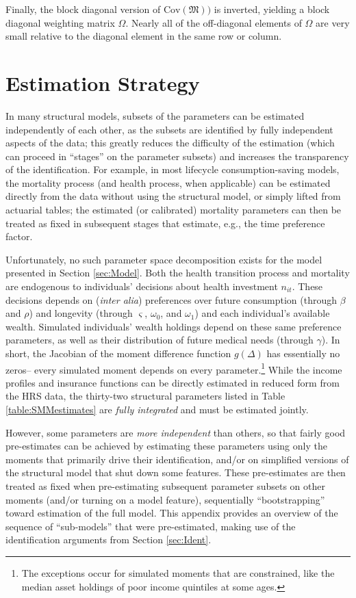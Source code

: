 \documentclass[12pt,pdftex,letterpaper]{article}
\newcommand{\Cov}{\text{Cov}}
\newcommand{\Invst}{n}
\newcommand{\MedShkParam}{\gamma}
\newcommand{\DiscFac}{\beta}
\newcommand{\LifeUtility}{\varsigma}
\newcommand{\CRRAcon}{\rho}
\newcommand{\BequestParam}{\omega}
\begin{document}
Finally, the block diagonal version of $\Cov(\mathfrak{M}))$ is inverted, yielding a block diagonal weighting matrix $\Omega$.  Nearly all of the off-diagonal elements of $\Omega$ are very small relative to the diagonal element in the same row or column.


\section{Estimation Strategy}
\label{app:Strategy}

In many structural models, subsets of the parameters can be estimated independently of each other, as the subsets are identified by fully independent aspects of the data; this greatly reduces the difficulty of the estimation (which can proceed in ``stages'' on the parameter subsets) and increases the transparency of the identification.  For example, in most lifecycle consumption-saving models, the mortality process (and health process, when applicable) can be estimated directly from the data without using the structural model, or simply lifted from actuarial tables; the estimated (or calibrated) mortality parameters can then be treated as fixed in subsequent stages that estimate, e.g., the time preference factor.

Unfortunately, no such parameter space decomposition exists for the model presented in Section \ref{sec:Model}. Both the health transition process and mortality are endogenous to individuals' decisions about health investment $\Invst_{it}$.  These decisions depends on (\textit{inter alia}) preferences over future consumption (through $\DiscFac$ and $\CRRAcon$) and longevity (through $\LifeUtility$, $\BequestParam_0$, and $\BequestParam_1$) and each individual's available wealth.  Simulated individuals' wealth holdings depend on these same preference parameters, as well as their distribution of future medical needs (through $\MedShkParam$).  In short, the Jacobian of the moment difference function $g(\Delta)$ has essentially no zeros-- every simulated moment depends on every parameter.\footnote{The exceptions occur for simulated moments that are constrained, like the median asset holdings of poor income quintiles at some ages.} While the income profiles and insurance functions can be directly estimated in reduced form from the HRS data, the thirty-two structural parameters listed in Table \ref{table:SMMestimates} are \textit{fully integrated} and must be estimated jointly.

However, some parameters are \textit{more independent} than others, so that fairly good pre-estimates can be achieved by estimating these parameters using only the moments that primarily drive their identification, and/or on simplified versions of the structural model that shut down some features.  These pre-estimates are then treated as fixed when pre-estimating subsequent parameter subsets on other moments (and/or turning on a model feature), sequentially ``bootstrapping'' toward estimation of the full model.  This appendix provides an overview of the sequence of ``sub-models'' that were pre-estimated, making use of the identification arguments from Section \ref{sec:Ident}.
\end{document}
